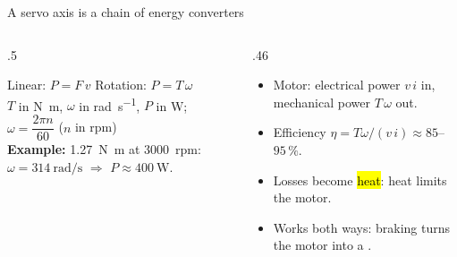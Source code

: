 \documentclass[aspectratio=169,10pt]{beamer}
\begin{document}
\begin{frame}{A servo axis is a chain of energy converters}
\vspace{1mm}
\begin{columns}[T]
\begin{column}{.5\textwidth}
\begin{defbox}
\small
Linear: $P=F\,v$ \quad Rotation: $P=T\,\omega$\\
$T$ in \si{\newton\metre}, $\omega$ in \si{\radian\per\second}, $P$ in \si{\watt};\; $\omega=\dfrac{2\pi n}{60}$ ($n$ in rpm)\\
\textbf{Example:} \SI{1.27}{\newton\metre} at \SI{3000}{rpm}: $\omega=\SI{314}{\radian\per\second}$ $\Rightarrow$ $P\approx\SI{400}{\watt}$.
\end{defbox}
\end{column}
\begin{column}{.46\textwidth}
\small
\begin{itemize}\setlength\itemsep{1pt}
\item Motor: electrical power $v\,i$ in, mechanical power $T\,\omega$ out.
\item Efficiency $\eta=T\omega/(v\,i)\approx 85$--$95\,\%$.
\item Losses become \hl{heat}: heat limits the motor.
\item Works both ways: braking turns the motor into a .
\end{itemize}
\end{column}
\end{columns}
\end{frame}
\end{document}
